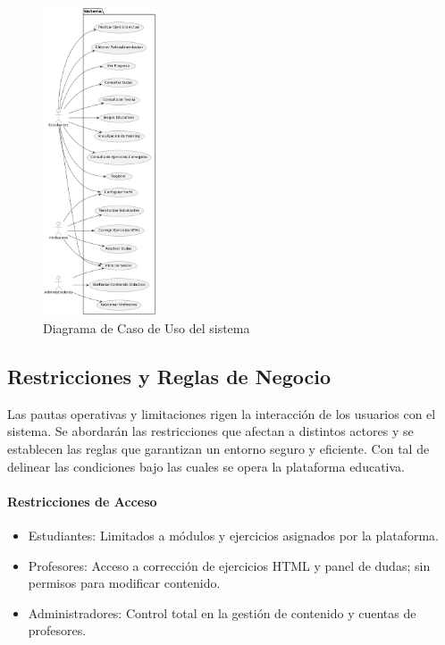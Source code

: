 \begin{figure}[H]
    \centering
    \includegraphics[width=0.3\textwidth]{imagenes/modelo.png}
    \caption{Diagrama de Caso de Uso del sistema}
    \label{fig:caso_uso}
\end{figure}

\subsection{Restricciones y Reglas de Negocio}

Las pautas operativas y limitaciones rigen la interacción de los usuarios con el sistema. Se abordarán las restricciones que afectan a distintos actores y se establecen las reglas que garantizan un entorno seguro y eficiente. Con tal de delinear las condiciones bajo las cuales se opera la plataforma educativa.

\paragraph{Restricciones de Acceso}
\begin{itemize}
    \item Estudiantes: Limitados a módulos y ejercicios asignados por la plataforma.
    \item Profesores: Acceso a corrección de ejercicios HTML y panel de dudas; sin permisos para modificar contenido.
    \item Administradores: Control total en la gestión de contenido y cuentas de profesores.
\end{itemize}

